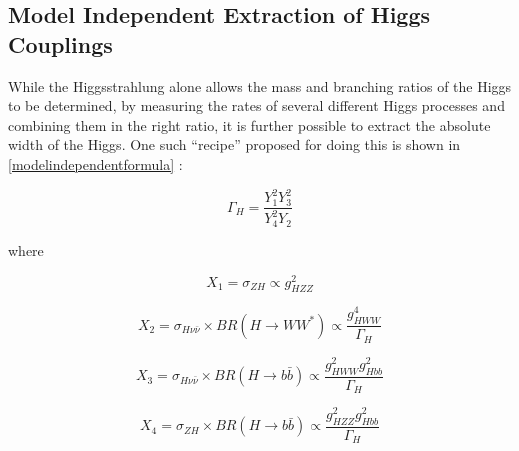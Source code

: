  
\subsection{Model Independent Extraction of Higgs Couplings}


While the Higgsstrahlung alone allows the mass and branching ratios of the Higgs to be determined, by measuring the rates of several different Higgs processes and combining them in the right ratio, it is further possible to extract the absolute width of the Higgs. One such ``recipe'' proposed for doing this is shown in \ref{modelindependentformula} \cite{Durig:2014lfa}:


\begin{equation}
  \label{modelindependentformula}
  \Gamma_H = \frac{Y_1^2Y_3^2}{Y_4^2Y_2}
\end{equation}

where

\begin{equation}
X_1=\sigma_{ZH} \propto g_{HZZ}^2
\end{equation}

\begin{equation}
  \label{X2}
  X_2=\sigma_{H\nu\bar{\nu}} \times BR(H\rightarrow WW^*) \propto \frac{g_{HWW}^4}{\Gamma_H}
\end{equation}

\begin{equation}
X_3=\sigma_{H\nu\bar{\nu}} \times BR(H\rightarrow b\bar{b}) \propto \frac{g_{HWW}^{2}g_{Hbb}^2}{\Gamma_H}
\end{equation}

\begin{equation}
X_4=\sigma_{ZH} \times BR(H\rightarrow b\bar{b}) \propto \frac{g_{HZZ}^{2}g_{Hbb}^2}{\Gamma_H}
\end{equation}


